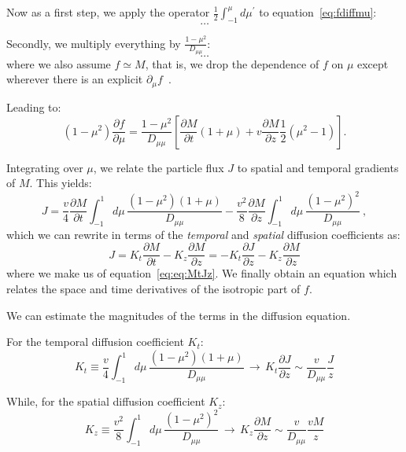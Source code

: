 {\color{red}Now as a first step, we apply the operator \( \frac{1}{2} \int_{-1}^\mu d\mu^\prime \) to equation~\eqref{eq:fdiffmu}:}
\begin{equation}
\dots
\end{equation}

{\color{red}Secondly, we multiply everything by \( \frac{1-\mu^2}{D_{\mu \mu}} \):}
\begin{equation}
\dots
\end{equation}
{\color{red}where we also assume \( f \simeq M \), that is, we drop the dependence of \( f \) on \( \mu \) except wherever there is an explicit \( \partial_\mu f \)~.}

Leading to:
%
\begin{equation}
(1 - \mu^2) \frac{\partial f}{\partial \mu} = \frac{1 - \mu^2}{D_{\mu\mu}} \left[\frac{\partial M}{\partial t}(1 + \mu) + v \frac{\partial M}{\partial z} \frac{1}{2} (\mu^2 - 1)\right].
\end{equation}

Integrating over \( \mu \), we relate the particle flux \( J \) to spatial and temporal gradients of \( M \). This yields:
\begin{equation}
J = \frac{v}{4} \frac{\partial M}{\partial t} \int_{-1}^1 d\mu \, \frac{(1 - \mu^2)(1 + \mu)}{D_{\mu\mu}} - \frac{v^2}{8} \frac{\partial M}{\partial z} \int_{-1}^1 d\mu \, \frac{(1 - \mu^2)^2}{D_{\mu\mu}}~,
\end{equation}
%
which we can rewrite in terms of the \emph{temporal} and \emph{spatial} diffusion coefficients as:
%
\begin{equation}
J = K_t \frac{\partial M}{\partial t} - K_z \frac{\partial M}{\partial z} = - K_t \frac{\partial J}{\partial z} - K_z \frac{\partial M}{\partial z} 
\end{equation}
%
where we make us of equation~\eqref{eq:eq:MtJz}. 
%
We finally obtain an equation which relates the space and time derivatives of the isotropic part of \( f \).

We can estimate the magnitudes of the terms in the diffusion equation.

For the temporal diffusion coefficient \( K_t \):
\[
K_t \equiv \frac{v}{4} \int_{-1}^1 d\mu \, \frac{(1 - \mu^2)(1 + \mu)}{D_{\mu\mu}} \, \rightarrow \, K_t \frac{\partial J}{\partial z}\sim \frac{v}{D_{\mu\mu}}\frac{J}{z}
\]

While, for the spatial diffusion coefficient \( K_z \):
\[
K_z \equiv \frac{v^2}{8} \int_{-1}^1 d\mu \, \frac{(1 - \mu^2)^2}{D_{\mu\mu}} \, \rightarrow \, K_z\frac{\partial M}{\partial z} \sim \frac{v}{D_{\mu\mu}}\frac{vM}{z}
\]

